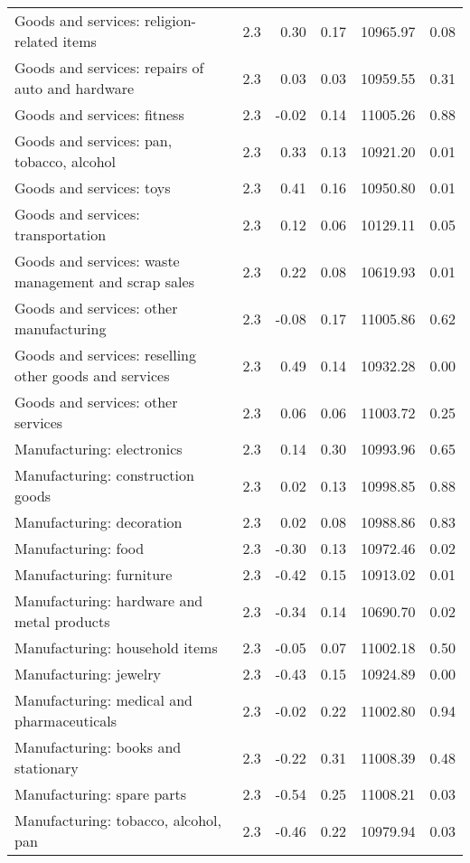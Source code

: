 \begin{longtable}{llrrrr}
  Goods and services: religion-related items & 2.3 & 0.30 & 0.17 & 10965.97 & 0.08 \\ 
  Goods and services: repairs of  auto and hardware & 2.3 & 0.03 & 0.03 & 10959.55 & 0.31 \\ 
  Goods and services: fitness & 2.3 & -0.02 & 0.14 & 11005.26 & 0.88 \\ 
  Goods and services: pan, tobacco, alcohol & 2.3 & 0.33 & 0.13 & 10921.20 & 0.01 \\ 
  Goods and services: toys & 2.3 & 0.41 & 0.16 & 10950.80 & 0.01 \\ 
  Goods and services: transportation & 2.3 & 0.12 & 0.06 & 10129.11 & 0.05 \\ 
  Goods and services: waste management and scrap sales & 2.3 & 0.22 & 0.08 & 10619.93 & 0.01 \\ 
  Goods and services: other manufacturing & 2.3 & -0.08 & 0.17 & 11005.86 & 0.62 \\ 
  Goods and services: reselling other goods and services & 2.3 & 0.49 & 0.14 & 10932.28 & 0.00 \\ 
  Goods and services: other services & 2.3 & 0.06 & 0.06 & 11003.72 & 0.25 \\ 
  Manufacturing: electronics & 2.3 & 0.14 & 0.30 & 10993.96 & 0.65 \\ 
  Manufacturing: construction goods & 2.3 & 0.02 & 0.13 & 10998.85 & 0.88 \\ 
  Manufacturing: decoration & 2.3 & 0.02 & 0.08 & 10988.86 & 0.83 \\ 
  Manufacturing: food & 2.3 & -0.30 & 0.13 & 10972.46 & 0.02 \\ 
  Manufacturing: furniture & 2.3 & -0.42 & 0.15 & 10913.02 & 0.01 \\ 
  Manufacturing: hardware and metal products & 2.3 & -0.34 & 0.14 & 10690.70 & 0.02 \\ 
  Manufacturing: household items & 2.3 & -0.05 & 0.07 & 11002.18 & 0.50 \\ 
  Manufacturing: jewelry & 2.3 & -0.43 & 0.15 & 10924.89 & 0.00 \\ 
  Manufacturing: medical and pharmaceuticals & 2.3 & -0.02 & 0.22 & 11002.80 & 0.94 \\ 
  Manufacturing: books and stationary & 2.3 & -0.22 & 0.31 & 11008.39 & 0.48 \\ 
  Manufacturing: spare parts & 2.3 & -0.54 & 0.25 & 11008.21 & 0.03 \\ 
  Manufacturing: tobacco, alcohol, pan & 2.3 & -0.46 & 0.22 & 10979.94 & 0.03 \\ 

\end{longtable}
